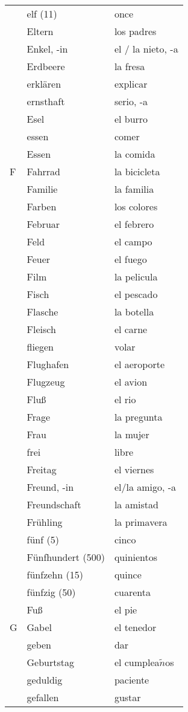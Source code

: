 \documentclass[10pt,spanish]{article}
\begin{document}
\begin{longtable}{p{} p{} | p{}}
& elf (11) & once  \\
& Eltern & los padres  \\
& Enkel, -in & el / la nieto, -a  \\
& Erdbeere & la fresa  \\
& erklären & explicar  \\
& ernsthaft & serio, -a\\
& Esel & el burro  \\
& essen & comer \\
& Essen & la comida \\
F & Fahrrad & la bicicleta \\
& Familie & la familia   \\
& Farben & los colores  \\
& Februar & el febrero  \\
& Feld & el campo  \\
& Feuer & el fuego  \\
& Film & la pelicula  \\
& Fisch & el pescado \\
& Flasche & la botella  \\
& Fleisch & el carne \\
& fliegen & volar \\
& Flughafen & el aeroporte \\
& Flugzeug & el avion  \\
& Fluß & el rio  \\
& Frage & la pregunta \\
& Frau & la mujer  \\
& frei & libre  \\
& Freitag & el viernes \\
& Freund, -in & el/la amigo, -a  \\
& Freundschaft & la amistad  \\
& Frühling & la primavera  \\
& fünf (5) & cinco  \\
& Fünfhundert (500) & quinientos \\
& fünfzehn (15) & quince  \\
& fünfzig (50) & cuarenta \\
& Fuß & el pie  \\
G & Gabel & el tenedor  \\
& geben & dar  \\
& Geburtstag & el cumplea$\tilde{n}$os  \\
& geduldig & paciente \\
& gefallen & gustar  \\

\end{longtable}
\end{document}
